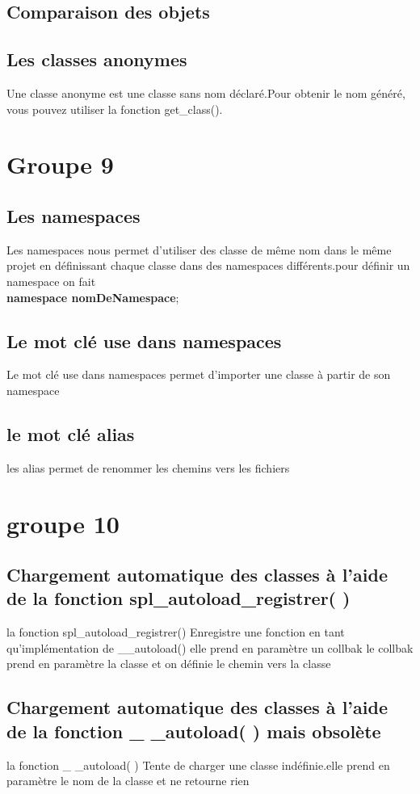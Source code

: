 \documentclass[12pt,b5paper]{article}
\begin{document}
\subsection{ Comparaison des objets}
 \subsection{Les classes anonymes}
 Une classe anonyme est une classe sans nom déclaré.Pour obtenir le nom généré, vous pouvez utiliser la fonction get\_class().


 \section{Groupe 9}
\subsection{ Les namespaces}
Les namespaces nous permet d'utiliser des classe de même nom dans le même projet en définissant chaque classe dans des namespaces différents.pour définir un namespace on fait\\ \textbf{namespace nomDeNamespace};
\subsection{ Le mot clé use dans namespaces}
Le  mot clé use dans namespaces permet d'importer une classe à partir de son namespace
\subsection{le mot clé alias}
les alias permet de renommer les chemins vers les fichiers

\section{groupe 10}

\subsection{Chargement automatique des classes à l’aide de la fonction spl\_autoload\_registrer( )}
la fonction spl\_autoload\_registrer()  Enregistre une fonction en tant qu'implémentation de \_\_autoload() elle prend en paramètre un collbak le collbak prend en paramètre  la classe et on définie le chemin vers la classe
\subsection{Chargement automatique des classes à l’aide de la fonction \_ \_autoload( ) mais obsolète}
 la fonction \_ \_autoload( ) Tente de charger une classe indéfinie.elle prend en paramètre le nom de la classe et ne retourne rien
\end{document}
